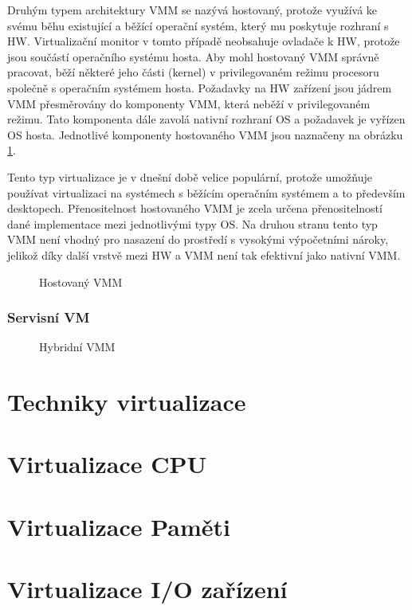 Druhým typem architektury VMM se nazývá hostovaný, protože využívá ke svému běhu existující a běžící operační systém, který mu poskytuje rozhraní s HW. Virtualizační monitor v tomto případě neobsahuje ovladače k HW, protože jsou
součástí operačního systému hosta. Aby mohl hostovaný VMM správně pracovat, běží některé jeho části (kernel) v privilegovaném režimu procesoru společně s operačním systémem hosta. Požadavky na HW zařízení jsou jádrem VMM přesměrovány
do komponenty VMM, která neběží v privilegovaném režimu. Tato komponenta dále zavolá nativní rozhraní OS a požadavek je vyřízen OS hosta. Jednotlivé komponenty hostovaného VMM jsou naznačeny na obrázku \ref{hosted_vmm}.

Tento typ virtualizace je v dnešní době velice populární, protože umožňuje používat virtualizaci na systémech s běžícím operačním systémem a to především desktopech. Přenositelnost hostovaného VMM je zcela určena přenositelností 
dané implementace mezi jednotlivými typy OS. Na druhou stranu tento typ VMM není vhodný pro nasazení do prostředí s vysokými výpočetními nároky, jelikož díky další vrstvě mezi HW a VMM není tak efektivní jako nativní VMM.

\begin{figure}
    \centering    
    \caption{Hostovaný VMM}
    \label{hosted_vmm}
\end{figure}

\subsubsection*{Servisní VM}



\begin{figure}
    \centering    
    \caption{Hybridní VMM}
    \label{hybrid_vmm}
\end{figure}

\section{Techniky virtualizace}
\label{virt_techniques}



\section{Virtualizace CPU}
\section{Virtualizace Paměti}
\section{Virtualizace I/O zařízení}


